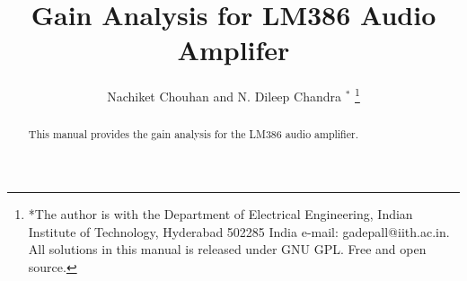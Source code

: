 \documentclass[journal,12pt,twocolumn]{IEEEtran}
\renewcommand\thesection{\arabic{section}}
\begin{document}
\makeatletter
{}
\makeatother
\let\StandardTheFigure\thefigure
\renewcommand{\thefigure}{\thesection}
\makeatletter
{}
\makeatother
\let\StandardTheFigure\thefigure
\let\StandardTheTable\thetable
\let\vec\mathbf
\def\putbox#1#2#3{\makebox[0in][l]{\makebox[#1][l]{}\raisebox{\baselineskip}[0in][0in]{\raisebox{#2}[0in][0in]{#3}}}}
     \def\rightbox#1{\makebox[0in][r]{#1}}
     \def\centbox#1{\makebox[0in]{#1}}
     \def\topbox#1{\raisebox{-\baselineskip}[0in][0in]{#1}}
     \def\midbox#1{\raisebox{-0.5\baselineskip}[0in][0in]{#1}}
\vspace{3cm}
\title{ 
Gain Analysis for LM386 Audio Amplifer 
}
\author{ Nachiket Chouhan and N. Dileep Chandra $^{*}$%
	\thanks{*The author is with the Department
		of Electrical Engineering, Indian Institute of Technology, Hyderabad
		502285 India e-mail:  gadepall@iith.ac.in. All solutions in this manual is released under GNU 
GPL.  Free and open source.}
	
}
\maketitle
\tableofcontents
\bigskip
\renewcommand{\thefigure}{\theenumi}
\renewcommand{\thetable}{\theenumi}
\begin{abstract}
This manual provides the gain analysis for the LM386 audio amplifier. 
\end{abstract}
\end{document}
